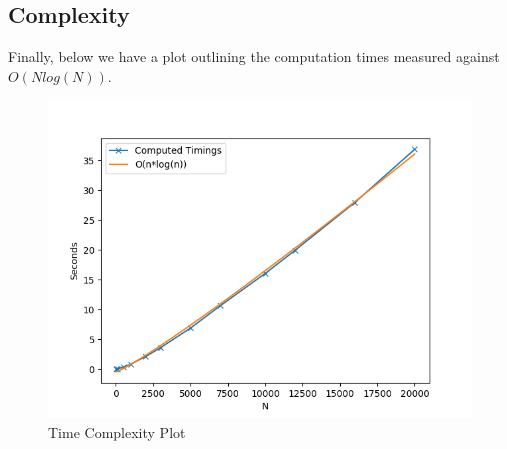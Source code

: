\subsection{Complexity}
Finally, below we have a plot outlining the computation times measured against $O(Nlog(N))$.
\begin{figure}[htb]
    \begin{center}
        \includegraphics[width=14cm]{../images/nlogn.jpg}
        \caption{Time Complexity Plot}
    \end{center}
\end{figure}
